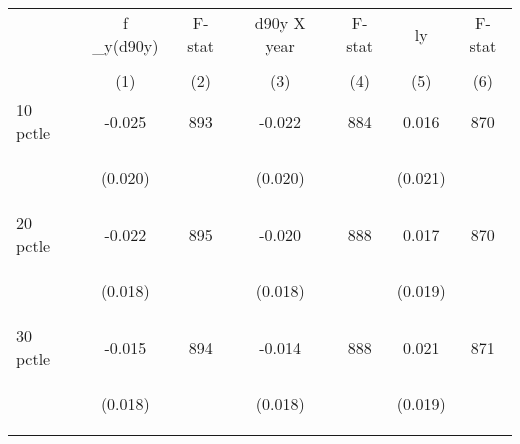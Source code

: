 \begin{tabular}{lcccccc}


\toprule


\multicolumn{1}{l}{} & \multicolumn{1}{c}{f \_y(d90y)} & \multicolumn{1}{c}{F-stat} & \multicolumn{1}{c}{d90y X year} & \multicolumn{1}{c}{F-stat} & \multicolumn{1}{c}{ly} & \multicolumn{1}{c}{F-stat}  \\

\cmidrule(l{1mm}r{1mm}){2-3} \cmidrule(l{1mm}r{1mm}){4-5} \cmidrule(l{1mm}r{1mm}){6-7}   \\

 & (1) & (2) & (3) & (4) & (5) & (6)  \\ 
 

\hline

10 pctle   &  -0.025   &  893  &   -0.022  &  884 &  0.016  &  870 \\

\vspace{4pt} &  \begin{footnotesize}(0.020)\end{footnotesize}   & &
			    \begin{footnotesize}(0.020)\end{footnotesize}   & &
			    \begin{footnotesize}(0.021)\end{footnotesize}   & 
			     \\          


20 pctle   &  -0.022   &  895  &   -0.020  &  888 &  0.017  &  870   \\

\vspace{4pt} &  \begin{footnotesize}(0.018)\end{footnotesize}   & &
			    \begin{footnotesize}(0.018)\end{footnotesize}   & &
			    \begin{footnotesize}(0.019)\end{footnotesize}   &
			     \\          


30 pctle   &  -0.015   &  894  &   -0.014  &  888 &  0.021  &  871   \\


\vspace{4pt} &  \begin{footnotesize}(0.018)\end{footnotesize}   & &
			    \begin{footnotesize}(0.018)\end{footnotesize}   & &
			    \begin{footnotesize}(0.019)\end{footnotesize}   &
			     \\          




\end{tabular}
